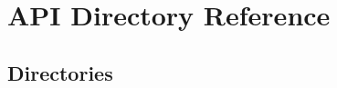 \section{A\+PI Directory Reference}
\label{dir_19ea4dbfe8f0e4681f60b9b97f7b5d11}
\subsection*{Directories}
\begin{DoxyCompactItemize}
\end{DoxyCompactItemize}
